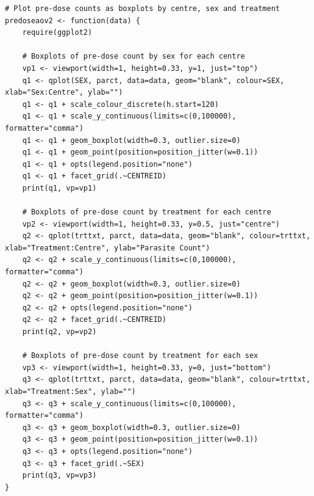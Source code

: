 \begin{lstlisting}[float=h,caption=Boxplots of pre-dose count by sex\, centre and treatment,label=R:predoseaov]
# Plot pre-dose counts as boxplots by centre, sex and treatment
predoseaov2 <- function(data) {
	require(ggplot2)

	# Boxplots of pre-dose count by sex for each centre
	vp1 <- viewport(width=1, height=0.33, y=1, just="top")
	q1 <- qplot(SEX, parct, data=data, geom="blank", colour=SEX, xlab="Sex:Centre", ylab="")
	q1 <- q1 + scale_colour_discrete(h.start=120)
	q1 <- q1 + scale_y_continuous(limits=c(0,100000), formatter="comma")
	q1 <- q1 + geom_boxplot(width=0.3, outlier.size=0)
	q1 <- q1 + geom_point(position=position_jitter(w=0.1))
	q1 <- q1 + opts(legend.position="none")
	q1 <- q1 + facet_grid(.~CENTREID)
	print(q1, vp=vp1)

	# Boxplots of pre-dose count by treatment for each centre
	vp2 <- viewport(width=1, height=0.33, y=0.5, just="centre")
	q2 <- qplot(trttxt, parct, data=data, geom="blank", colour=trttxt, xlab="Treatment:Centre", ylab="Parasite Count")
	q2 <- q2 + scale_y_continuous(limits=c(0,100000), formatter="comma")
	q2 <- q2 + geom_boxplot(width=0.3, outlier.size=0)
	q2 <- q2 + geom_point(position=position_jitter(w=0.1))
	q2 <- q2 + opts(legend.position="none")
	q2 <- q2 + facet_grid(.~CENTREID)
	print(q2, vp=vp2)

	# Boxplots of pre-dose count by treatment for each sex
	vp3 <- viewport(width=1, height=0.33, y=0, just="bottom")
	q3 <- qplot(trttxt, parct, data=data, geom="blank", colour=trttxt, xlab="Treatment:Sex", ylab="")
	q3 <- q3 + scale_y_continuous(limits=c(0,100000), formatter="comma")
	q3 <- q3 + geom_boxplot(width=0.3, outlier.size=0)
	q3 <- q3 + geom_point(position=position_jitter(w=0.1))
	q3 <- q3 + opts(legend.position="none")
	q3 <- q3 + facet_grid(.~SEX)
	print(q3, vp=vp3)
}
\end{lstlisting}

